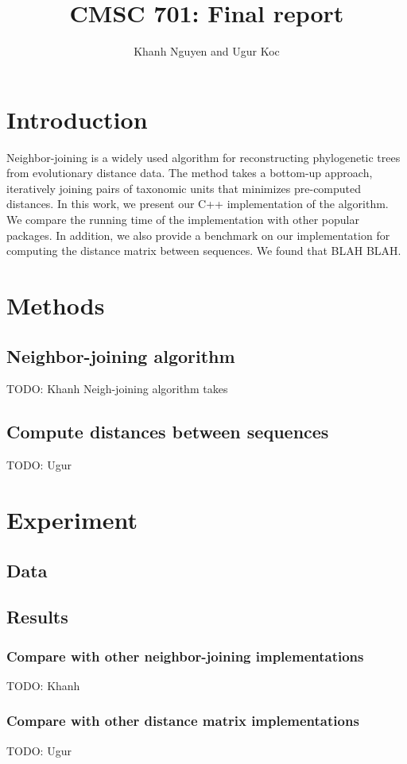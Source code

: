 \documentclass[11pt,letterpaper]{article}
\title{
   CMSC 701: Final report
}
\author{
	Khanh Nguyen and Ugur Koc
}
\theoremstyle{definition}
\begin{document}
\maketitle

\section{Introduction}

Neighbor-joining is a widely used algorithm for reconstructing phylogenetic trees from evolutionary distance data. The method takes a bottom-up approach, iteratively joining pairs of taxonomic units that minimizes pre-computed distances. In this work, we present our C++ implementation of the algorithm. We compare the running time of the implementation with other popular packages. In addition, we also provide a benchmark on our implementation for computing the distance matrix between sequences. We found that BLAH BLAH.

\section{Methods}
\subsection{Neighbor-joining algorithm}

TODO: Khanh 
Neigh-joining algorithm takes 


\subsection{Compute distances between sequences}

TODO: Ugur

\section{Experiment}
\subsection{Data}


\subsection{Results}
\subsubsection{Compare with other neighbor-joining implementations}

TODO: Khanh 

\subsubsection{Compare with other distance matrix implementations}

TODO: Ugur
\end{document}
